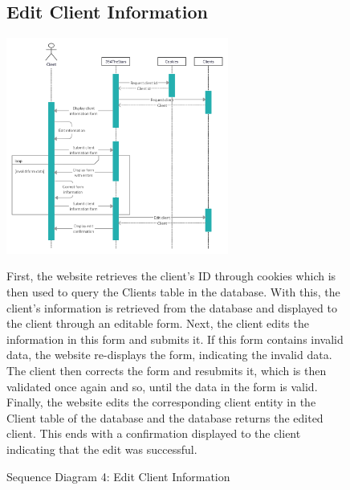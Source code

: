 \documentclass[11pt]{article}
\newcounter{use case ID}
\begin{document}
\begin{figure}[ht!]
    \subsection{Edit Client Information}
    \centering
    \includegraphics[width=0.65\textwidth,height=0.3\paperheight]{Diagrams/Sequence/Edit_Client_Info.jpg}
    \caption{Sequence Diagram 4: Edit Client Information}
    \label{fig: Edit Client Information}
    \begin{justify}
        First, the website retrieves the client’s ID through cookies which is then used to query the Clients table in the database. With this, the client’s information is retrieved from the database and displayed to the client through an editable form. Next, the client edits the information in this form and submits it. If this form contains invalid data, the website re-displays the form, indicating the invalid data. The client then corrects the form and resubmits it, which is then validated once again and so, until the data in the form is valid. Finally, the website edits the corresponding client entity in the Client table of the database and the database returns the edited client. This ends with a confirmation displayed to the client indicating that the edit was successful.
    \end{justify}
\end{figure}
\end{document}
